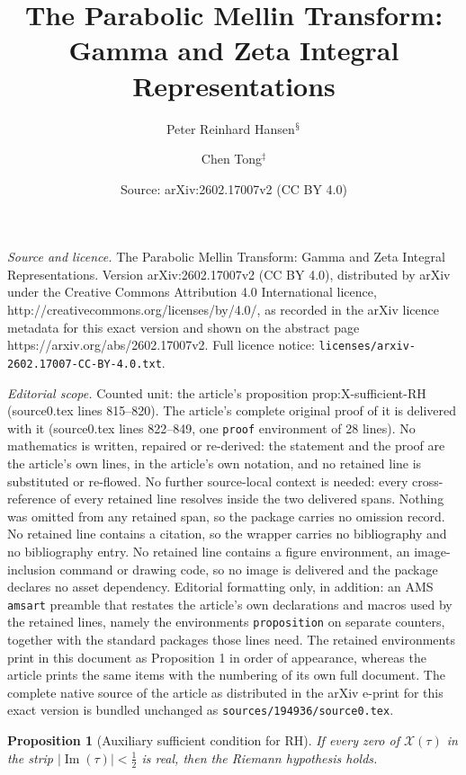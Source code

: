 \documentclass[10pt,a4paper]{amsart}
\title{The Parabolic Mellin Transform: Gamma and Zeta Integral Representations}
\author{Peter Reinhard Hansen$^{\mathsection}$ \and Chen Tong$^{\ddagger}$}
\date{Source: arXiv:2602.17007v2 (CC BY 4.0)}
\newtheorem{proposition}{Proposition}
\begin{document}
\maketitle

\noindent\emph{Source and licence.} The Parabolic Mellin Transform: Gamma and Zeta Integral Representations. Version arXiv:2602.17007v2 (CC BY 4.0), distributed by arXiv under the Creative Commons Attribution 4.0 International licence, http://creativecommons.org/licenses/by/4.0/, as recorded in the arXiv licence metadata for this exact version and shown on the abstract page https://arxiv.org/abs/2602.17007v2. Full licence notice: \texttt{licenses/arxiv-2602.17007-CC-BY-4.0.txt}.\par\smallskip

\noindent\textit{Editorial scope.} Counted unit: the article's proposition prop:X-sufficient-RH (source0.tex lines 815--820). The article's complete original proof of it is delivered with it (source0.tex lines 822--849, one \texttt{proof} environment of 28 lines). No mathematics is written, repaired or re-derived: the statement and the proof are the article's own lines, in the article's own notation, and no retained line is substituted or re-flowed.  No further source-local context is needed: every cross-reference of every retained line resolves inside the two delivered spans.  Nothing was omitted from any retained span, so the package carries no omission record.  No retained line contains a citation, so the wrapper carries no bibliography and no bibliography entry.  No retained line contains a figure environment, an image-inclusion command or drawing code, so no image is delivered and the package declares no asset dependency.  Editorial formatting only, in addition: an AMS \texttt{amsart} preamble that restates the article's own declarations and macros used by the retained lines, namely the environments \texttt{proposition} on separate counters, together with the standard packages those lines need.  The retained environments print in this document as Proposition 1 in order of appearance, whereas the article prints the same items with the numbering of its own full document.  The complete native source of the article as distributed in the arXiv e-print for this exact version is bundled unchanged as \texttt{sources/194936/source0.tex}.
\begin{proposition}[Auxiliary sufficient condition for RH]
\label{prop:X-sufficient-RH}
If every zero of $\mathcal{X}(\tau)$ in the strip
$|\operatorname{Im}(\tau)|<\tfrac{1}{2}$ is real, then the Riemann hypothesis
holds.
\end{proposition}
\end{document}
